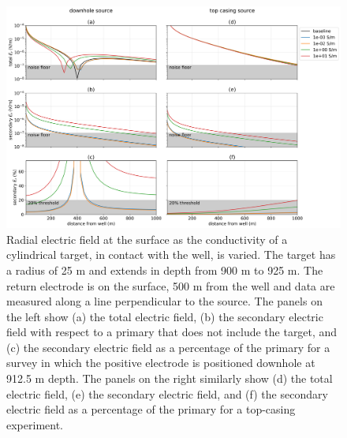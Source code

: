 \begin{figure}
    \begin{center}
    \includegraphics[width=\textwidth]{figures/target_electric_fields.png}
    \end{center}
\caption{
    Radial electric field at the surface as the conductivity of a cylindrical target, in contact with the well,
    is varied. The target has a radius of 25 m and extends in depth from 900 m to 925 m. The return electrode
    is on the surface, 500 m from the well and data are measured along a line perpendicular to the source.
    The panels on the left show
    (a) the total electric field, (b) the secondary electric field with respect to a primary that does not include the target,
    and (c) the secondary electric field as a percentage of the primary for a survey in which the positive electrode is
    positioned downhole at 912.5 m depth. The panels on the right similarly show (d) the total electric field, (e) the
    secondary electric field, and (f) the secondary electric field as a percentage of the primary for a top-casing experiment.
}
\label{fig:target_electric_fields}
\end{figure}
